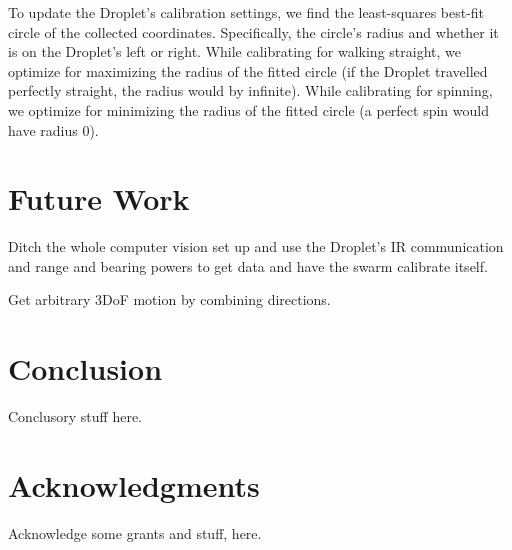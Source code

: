 \documentclass[letterpaper, 10pt, conference]{ieeeconf}
\begin{document}
To update the Droplet's calibration settings, we find the least-squares best-fit circle of the collected coordinates. Specifically, the circle's radius and whether it is on the Droplet's left or right. While calibrating for walking straight, we optimize for maximizing the radius of the fitted circle (if the Droplet travelled perfectly straight, the radius would by infinite). While calibrating for spinning, we optimize for minimizing the radius of the fitted circle (a perfect spin would have radius 0).

\section{Future Work}
Ditch the whole computer vision set up and use the Droplet's IR communication and range and bearing powers to get data and have the swarm calibrate itself.

Get arbitrary 3DoF motion by combining directions.

\section{Conclusion}
Conclusory stuff here.

\section*{Acknowledgments}
Acknowledge some grants and stuff, here.



\end{document}
